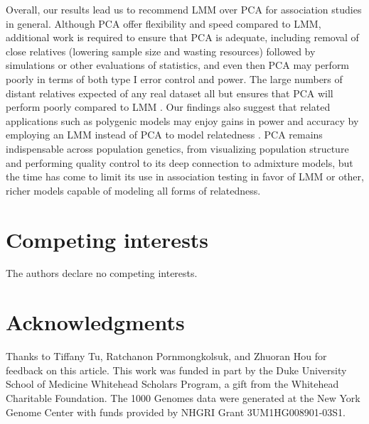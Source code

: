 \documentclass[9pt,lineno]{elife}
\begin{document}
Overall, our results lead us to recommend LMM over PCA for association studies in general.
Although PCA offer flexibility and speed compared to LMM, additional work is required to ensure that PCA is adequate, including removal of close relatives (lowering sample size and wasting resources) followed by simulations or other evaluations of statistics, and even then PCA may perform poorly in terms of both type I error control and power.
The large numbers of distant relatives expected of any real dataset all but ensures that PCA will perform poorly compared to LMM \citep{henn_cryptic_2012, shchur_number_2018, loh_mixed-model_2018}.
Our findings also suggest that related applications such as polygenic models may enjoy gains in power and accuracy by employing an LMM instead of PCA to model relatedness \citep{rakitsch_lasso_2013,qian_fast_2020}.
PCA remains indispensable across population genetics, from visualizing population structure and performing quality control to its deep connection to admixture models, but the time has come to limit its use in association testing in favor of LMM or other, richer models capable of modeling all forms of relatedness.

\section{Competing interests}
The authors declare no competing interests.

\section{Acknowledgments}
Thanks to Tiffany Tu, Ratchanon Pornmongkolsuk, and Zhuoran Hou for feedback on this article.
This work was funded in part by the Duke University School of Medicine Whitehead Scholars Program, a gift from the Whitehead Charitable Foundation.
The 1000 Genomes data were generated at the New York Genome Center with funds provided by NHGRI Grant 3UM1HG008901-03S1.
\end{document}

